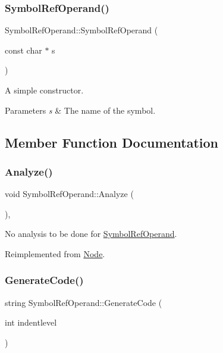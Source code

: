 \subsubsection{\texorpdfstring{Symbol\+Ref\+Operand()}{SymbolRefOperand()}}
{\footnotesize\ttfamily Symbol\+Ref\+Operand\+::\+Symbol\+Ref\+Operand (\begin{DoxyParamCaption}\item[{const char $\ast$}]{s }\end{DoxyParamCaption})}

A simple constructor. 
\begin{DoxyParams}{Parameters}
{\em s} & The name of the symbol. \\
\hline
\end{DoxyParams}


\subsection{Member Function Documentation}
\mbox{\label{class_symbol_ref_operand_a41ac48ee73184e0fe254ea735c7ea471}} 
\subsubsection{\texorpdfstring{Analyze()}{Analyze()}}
{\footnotesize\ttfamily void Symbol\+Ref\+Operand\+::\+Analyze (\begin{DoxyParamCaption}{ }\end{DoxyParamCaption})\hspace{0.3cm}{\ttfamily [inline]}, {\ttfamily [virtual]}}

No analysis to be done for \hyperlink{class_symbol_ref_operand}{Symbol\+Ref\+Operand}. 

Reimplemented from \hyperlink{class_node_a5f88d55c6f253a29def7ccc443d83d47}{Node}.

\mbox{\label{class_symbol_ref_operand_afdbed4a7baf9ede2a08687fc8a5704d9}} 
\subsubsection{\texorpdfstring{Generate\+Code()}{GenerateCode()}}
{\footnotesize\ttfamily string Symbol\+Ref\+Operand\+::\+Generate\+Code (\begin{DoxyParamCaption}\item[{int}]{indentlevel }\end{DoxyParamCaption})\hspace{0.3cm}{\ttfamily [virtual]}}

